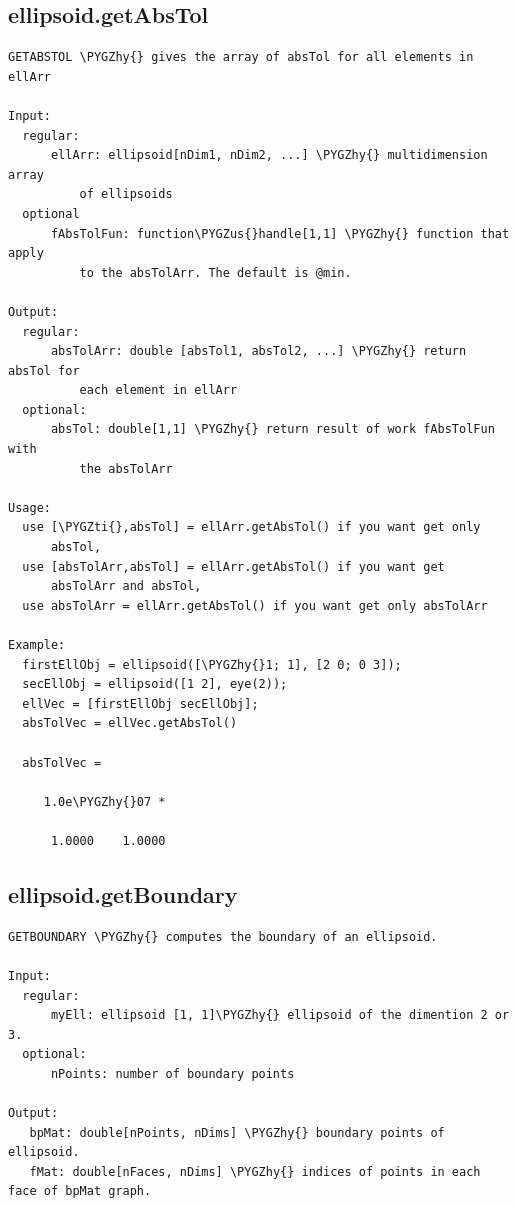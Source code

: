 \documentclass[letterpaper,10pt,english]{sphinxmanual}
\def\PYGZus{\char`\_}
\def\PYGZhy{\char`\-}
\def\PYGZti{\char`\~}
\begin{document}
\subsection{ellipsoid.getAbsTol}
\label{chap_functions:ellipsoid-getabstol}
\begin{Verbatim}[commandchars=\\\{\}]
GETABSTOL \PYGZhy{} gives the array of absTol for all elements in ellArr

Input:
  regular:
      ellArr: ellipsoid[nDim1, nDim2, ...] \PYGZhy{} multidimension array
          of ellipsoids
  optional
      fAbsTolFun: function\PYGZus{}handle[1,1] \PYGZhy{} function that apply
          to the absTolArr. The default is @min.

Output:
  regular:
      absTolArr: double [absTol1, absTol2, ...] \PYGZhy{} return absTol for
          each element in ellArr
  optional:
      absTol: double[1,1] \PYGZhy{} return result of work fAbsTolFun with
          the absTolArr

Usage:
  use [\PYGZti{},absTol] = ellArr.getAbsTol() if you want get only
      absTol,
  use [absTolArr,absTol] = ellArr.getAbsTol() if you want get
      absTolArr and absTol,
  use absTolArr = ellArr.getAbsTol() if you want get only absTolArr

Example:
  firstEllObj = ellipsoid([\PYGZhy{}1; 1], [2 0; 0 3]);
  secEllObj = ellipsoid([1 2], eye(2));
  ellVec = [firstEllObj secEllObj];
  absTolVec = ellVec.getAbsTol()

  absTolVec =

     1.0e\PYGZhy{}07 *

      1.0000    1.0000
\end{Verbatim}


\subsection{ellipsoid.getBoundary}
\label{chap_functions:ellipsoid-getboundary}
\begin{Verbatim}[commandchars=\\\{\}]
GETBOUNDARY \PYGZhy{} computes the boundary of an ellipsoid.

Input:
  regular:
      myEll: ellipsoid [1, 1]\PYGZhy{} ellipsoid of the dimention 2 or 3.
  optional:
      nPoints: number of boundary points

Output:
   bpMat: double[nPoints, nDims] \PYGZhy{} boundary points of ellipsoid.
   fMat: double[nFaces, nDims] \PYGZhy{} indices of points in each face of bpMat graph.
\end{Verbatim}
\end{document}
